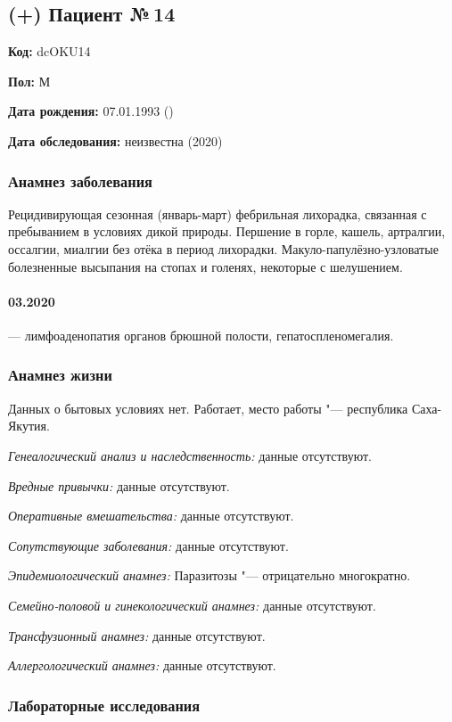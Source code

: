 \documentclass[a4paper,14pt]{extarticle}
\begin{document}
\newpage
\subsection*{(+) Пациент №\,14}

\textbf{Код:} dcOKU14 

\textbf{Пол:} М 

\textbf{Дата рождения:} 07.01.1993 ()

\textbf{Дата обследования:} неизвестна (2020)

\subsubsection*{Анамнез заболевания}

Рецидивирующая сезонная (январь-март) фебрильная лихорадка, связанная с пребыванием в условиях дикой природы.
Першение в горле, кашель, артралгии, оссалгии, миалгии без отёка в период лихорадки.
Макуло-папулёзно-узловатые болезненные высыпания на стопах и голенях, некоторые с шелушением.
\paragraph{03.2020} --- лимфоаденопатия органов брюшной полости, гепатоспленомегалия.

\subsubsection*{Анамнез жизни}

Данных о бытовых условиях нет.
Работает, место работы "--- республика Саха-Якутия.

\emph{Генеалогический анализ и наследственность:} данные отсутствуют.

\emph{Вредные привычки:} данные отсутствуют.

\emph{Оперативные вмешательства:} данные отсутствуют.

\emph{Сопутствующие заболевания:} данные отсутствуют.

\emph{Эпидемиологический анамнез:} Паразитозы "--- отрицательно многократно.

\emph{Семейно-половой и гинекологический анамнез:} данные отсутствуют.

\emph{Трансфузионный анамнез:} данные отсутствуют.

\emph{Аллергологический анамнез:} данные отсутствуют.

\subsubsection*{Лабораторные исследования}
\end{document}
